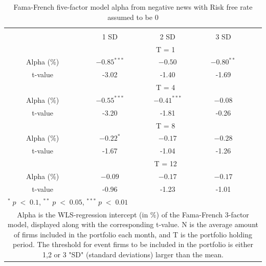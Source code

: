 \setlength{\tabcolsep}{15pt}
\begin{table}[]
\small
\centering
\caption{Fama-French five-factor model alpha from negative news with Risk free rate assumed to be 0} 
\begin{tabular}{ccccccc}
\hline \hline \\ 
 &     &  &    1 SD  &  2 SD  &  3 SD  &  \\ \cline{4-6} 
& & & \multicolumn{3}{c}{ T = 1} & \\ \cline{2-6}
& Alpha (\%)  &  & $-0.85^{***}$  & $-0.50$  & $-0.80^{**}$ &  \\
& t-value &  & -3.02 & -1.40  & -1.69 & \\
& & & \multicolumn{3}{c}{ T = 4} & \\ \cline{2-6}
& Alpha (\%)  &  & $-0.55^{***}$  & $-0.41^{***}$  &  $-0.08$ & \\
& t-value & & -3.20 & -1.81 & -0.26 & \\
& & & \multicolumn{3}{c}{ T = 8} & \\ \cline{2-6}
& Alpha (\%)  &  & $-0.22^{*}$   & $-0.17$  & $-0.28$ &  \\
& t-value &  & -1.67  & -1.04 & -1.26 & \\
&  & & \multicolumn{3}{c}{ T = 12} & \\ \cline{2-6}
& Alpha (\%)  &  & $-0.09$  & $-0.17$  & $-0.17$ &  \\
& t-value &  & -0.96  & -1.23 & -1.01 & \\
\hline \hline
 \multicolumn{7}{l}{ \footnotesize $^* \; p\; <\; 0.1$, $ ^{**} \; p\; <\; 0.05$, $ ^{***} \; p\; <\; 0.01$  } \\
 \multicolumn{7}{p{11.5cm}}{ \footnotesize Alpha is the WLS-regression intercept (in \%) of the Fama-French 3-factor model, displayed along with the corresponding t-value. N is the average amount of firms included in the portfolio each month, and T is the portfolio holding period. The threshold for event firms to be included in the portfolio is either 1,2 or 3 "SD" (standard deviations) larger than the mean.}  \\ 
\end{tabular}
\label{tab: FF5_neg_sensi_rf}
\end{table}









